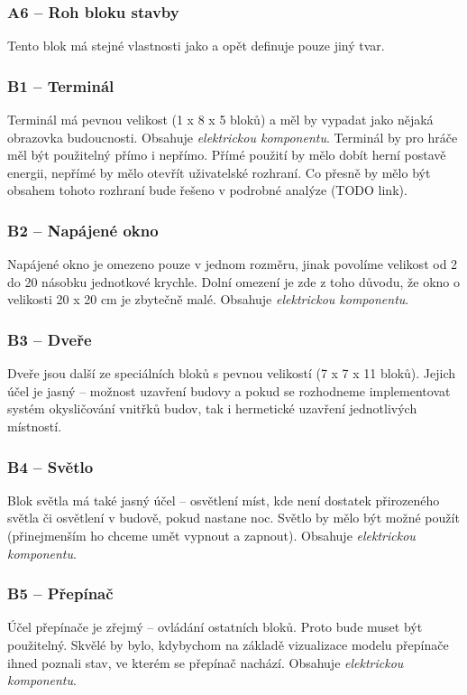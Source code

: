 \subsubsection{A6 -- Roh bloku stavby}
\label{blocks:A6}
Tento blok má stejné vlastnosti jako  a opět definuje pouze jiný tvar.



\subsubsection{B1 -- Terminál}
\label{blocks:B1}
Terminál má pevnou velikost (1 x 8 x 5 bloků) a měl by vypadat jako nějaká obrazovka budoucnosti. Obsahuje \textit{elektrickou komponentu}. Terminál by pro hráče měl být použitelný přímo i nepřímo. Přímé použití by mělo dobít herní postavě energii, nepřímé by mělo otevřít uživatelské rozhraní. Co přesně by mělo být obsahem tohoto rozhraní bude řešeno v podrobné analýze (TODO link).

\subsubsection{B2 -- Napájené okno}
\label{blocks:B2}
Napájené okno je omezeno pouze v jednom rozměru, jinak povolíme velikost od 2 do 20 násobku jednotkové krychle. Dolní omezení je zde z toho důvodu, že okno o velikosti 20 x 20 cm je zbytečně malé. Obsahuje \textit{elektrickou komponentu}.


\subsubsection{B3 -- Dveře}
\label{blocks:B3}
Dveře jsou další ze speciálních bloků s pevnou velikostí (7 x 7 x 11 bloků). Jejich účel je jasný -- možnost uzavření budovy a pokud se rozhodneme implementovat systém okysličování vnitřků budov, tak i hermetické uzavření jednotlivých místností.


\subsubsection{B4 -- Světlo}
\label{blocks:B4}
Blok světla má také jasný účel -- osvětlení míst, kde není dostatek přirozeného světla či osvětlení v budově, pokud nastane noc. Světlo by mělo být možné použít (přinejmenším ho chceme umět vypnout a zapnout). Obsahuje \textit{elektrickou komponentu}. 


\subsubsection{B5 -- Přepínač}
\label{blocks:B5}
Účel přepínače je zřejmý -- ovládání ostatních bloků. Proto bude muset být použitelný. Skvělé by bylo, kdybychom na základě vizualizace modelu přepínače ihned poznali stav, ve kterém se přepínač nachází. Obsahuje \textit{elektrickou komponentu}. 


